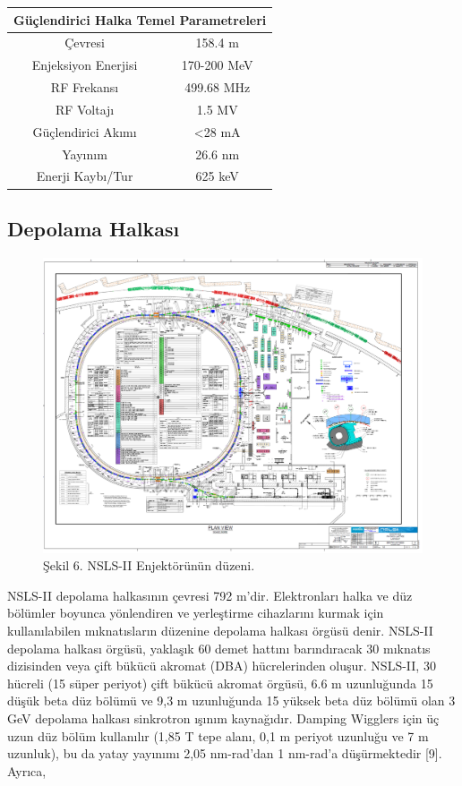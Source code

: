\documentclass{article}
\begin{document}
\begin{table}[h!]
\centering
\begin{tabular}{@{}|c|c|@{}}
\toprule
\multicolumn{2}{|c|}{Güçlendirici Halka Temel Parametreleri}                 \\ \midrule
Çevresi & 158.4 m \\ \midrule
Enjeksiyon Enerjisi & 170-200 MeV \\ \midrule
RF Frekansı & 499.68 MHz \\ \midrule
RF Voltajı &  1.5 MV \\ \midrule
Güçlendirici Akımı & <28 mA \\ \midrule
Yayınım & 26.6 nm \\ \midrule
Enerji Kaybı/Tur & 625 keV \\ \bottomrule
\end{tabular}
\end{table}



\newpage
	\subsection{Depolama Halkası}
	
	
	\begin{figure}[h!]
 \centering
\includegraphics[width=16.7cm]{map.png}
\caption*{Şekil 6. NSLS-II Enjektörünün düzeni.}
	\end{figure}
	
NSLS-II depolama halkasının çevresi 792 m'dir. Elektronları halka ve düz bölümler boyunca yönlendiren ve yerleştirme cihazlarını kurmak için kullanılabilen mıknatısların düzenine depolama halkası örgüsü denir. NSLS-II depolama halkası örgüsü, yaklaşık 60 demet hattını barındıracak 30 mıknatıs dizisinden veya çift bükücü akromat (DBA) hücrelerinden oluşur. NSLS-II, 30 hücreli (15 süper periyot) çift bükücü akromat örgüsü, 6.6 m uzunluğunda 15 düşük beta düz bölümü ve 9,3 m uzunluğunda 15 yüksek beta düz bölümü olan 3 GeV depolama halkası sinkrotron ışınım kaynağıdır. Damping Wigglers için üç uzun düz bölüm kullanılır (1,85 T tepe alanı, 0,1 m periyot uzunluğu ve 7 m uzunluk), bu da yatay yayınımı 2,05 nm-rad'dan 1 nm-rad'a düşürmektedir [9]. Ayrıca,
\end{document}
